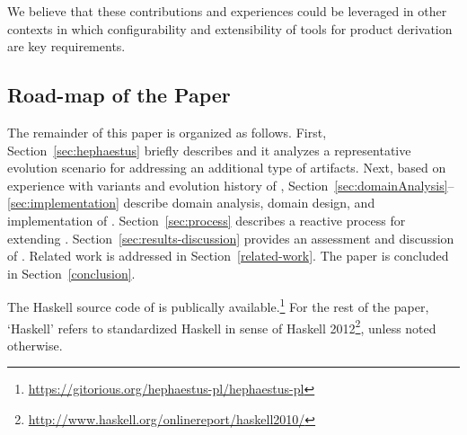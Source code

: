 We believe that these contributions and experiences could be leveraged in other contexts in which configurability and extensibility of tools for product derivation are key requirements. 


\subsection*{Road-map of the Paper}

The remainder of this paper is organized as follows. First, Section~\ref{sec:hephaestus} briefly describes \hp{} and it analyzes a representative evolution scenario for addressing an additional type of artifacts. Next, based on experience with variants and evolution history of \hp, Section~\ref{sec:domainAnalysis}--\ref{sec:implementation} describe 
domain analysis, domain design, and implementation of \hpl. Section~\ref{sec:process} describes a reactive process for extending \hpl. Section~\ref{sec:results-discussion} provides an assessment and discussion of \hpl. Related work is addressed in Section~\ref{related-work}. The paper is concluded in Section~\ref{conclusion}. 

The Haskell source code of \hpl{} is publically available.\footnote{\url{https://gitorious.org/hephaestus-pl/hephaestus-pl}} For the rest of the paper, `Haskell' refers to standardized Haskell in sense of Haskell 2012\footnote{\url{http://www.haskell.org/onlinereport/haskell2010/}}, unless noted otherwise.

